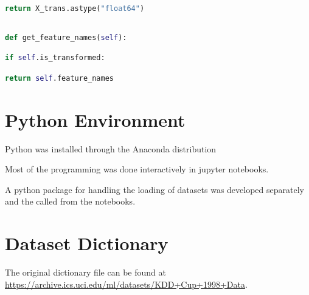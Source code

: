 \documentclass[
  11pt,
  a4paper,
  DIV=12,captions=tableheading,oneside]{scrbook}
\begin{document}
\begin{lstlisting}[language=Python,stepnumber=2,basicstyle=\footnotesize]
        return X_trans.astype("float64")\end{lstlisting}
\begin{lstlisting}[language=Python,stepnumber=2,basicstyle=\footnotesize]
\end{lstlisting}
\begin{lstlisting}[language=Python,stepnumber=2,basicstyle=\footnotesize]
    def get_feature_names(self):\end{lstlisting}
\begin{lstlisting}[language=Python,stepnumber=2,basicstyle=\footnotesize]
        if self.is_transformed:\end{lstlisting}
\begin{lstlisting}[language=Python,stepnumber=2,basicstyle=\footnotesize]
            return self.feature_names\end{lstlisting}

\hypertarget{python-environment}{%
\section{Python Environment}\label{python-environment}}

Python was installed through the Anaconda distribution

Most of the programming was done interactively in jupyter notebooks.

A python package for handling the loading of datasets was developed separately and the called from the notebooks.

\hypertarget{dataset-dictionary}{%
\section{Dataset Dictionary}\label{dataset-dictionary}}

The original dictionary file can be found at \url{https://archive.ics.uci.edu/ml/datasets/KDD+Cup+1998+Data}.
\end{document}
